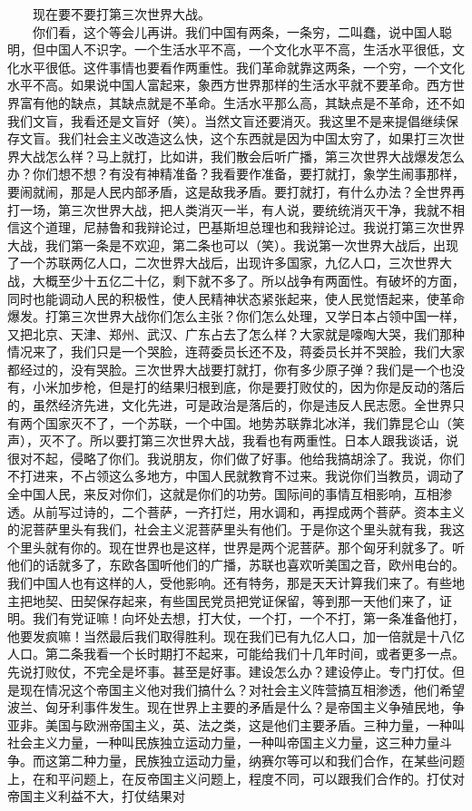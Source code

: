 \documentclass[cn,11pt,chinese]{elegantbook}
\begin{document}
　　现在要不要打第三次世界大战。\\
　　你们看，这个等会儿再讲。我们中国有两条，一条穷，二叫蠢，说中国人聪明，但中国人不识字。一个生活水平不高，一个文化水平不高，生活水平很低，文化水平很低。这件事情也要看作两重性。我们革命就靠这两条，一个穷，一个文化水平不高。如果说中国人富起来，象西方世界那样的生活水平就不要革命。西方世界富有他的缺点，其缺点就是不革命。生活水平那么高，其缺点是不革命，还不如我们文盲，我看还是文盲好（笑）。当然文盲还要消灭。我这里不是来提倡继续保存文盲。我们社会主义改造这么快，这个东西就是因为中国太穷了，如果打三次世界大战怎么样？马上就打，比如讲，我们散会后听广播，第三次世界大战爆发怎么办？你们想不想？有没有神精准备？我看要作准备，要打就打，象学生闹事那样，要闹就闹，那是人民内部矛盾，这是敌我矛盾。要打就打，有什么办法？全世界再打一场，第三次世界大战，把人类消灭一半，有人说，要统统消灭干净，我就不相信这个道理，尼赫鲁和我辩论过，巴基斯坦总理也和我辩论过。我说打第三次世界大战，我们第一条是不欢迎，第二条也可以（笑）。我说第一次世界大战后，出现了一个苏联两亿人口，二次世界大战后，出现许多国家，九亿人口，三次世界大战，大概至少十五亿二十亿，剩下就不多了。所以战争有两面性。有破坏的方面，同时也能调动人民的积极性，使人民精神状态紧张起来，使人民觉悟起来，使革命爆发。打第三次世界大战你们怎么主张？你们怎么处理，又学日本占领中国一样，又把北京、天津、郑州、武汉、广东占去了怎么样？大家就是嚎啕大哭，我们那种情况来了，我们只是一个哭脸，连蒋委员长还不及，蒋委员长并不哭脸，我们大家都经过的，没有哭脸。三次世界大战要打就打，你有多少原子弹？我们是一个也没有，小米加步枪，但是打的结果归根到底，你是要打败仗的，因为你是反动的落后的，虽然经济先进，文化先进，可是政治是落后的，你是违反人民志愿。全世界只有两个国家灭不了，一个苏联，一个中国。地势苏联靠北冰洋，我们靠昆仑山（笑声），灭不了。所以要打第三次世界大战，我看也有两重性。日本人跟我谈话，说很对不起，侵略了你们。我说朋友，你们做了好事。他给我搞胡涂了。我说，你们不打进来，不占领这么多地方，中国人民就教育不过来。我说你们当教员，调动了全中国人民，来反对你们，这就是你们的功劳。国际间的事情互相影响，互相渗透。从前写过诗的，二个菩萨，一齐打烂，用水调和，再捏成两个菩萨。资本主义的泥菩萨里头有我们，社会主义泥菩萨里头有他们。于是你这个里头就有我，我这个里头就有你的。现在世界也是这样，世界是两个泥菩萨。那个匈牙利就多了。听他们的话就多了，东欧各国听他们的广播，苏联也喜欢听美国之音，欧州电台的。我们中国人也有这样的人，受他影响。还有特务，那是天天计算我们来了。有些地主把地契、田契保存起来，有些国民党员把党证保留，等到那一天他们来了，证明。我们有党证嘛！向坏处去想，打大仗，一个打，一个不打，第一条准备他打，他要发疯嘛！当然最后我们取得胜利。现在我们已有九亿人口，加一倍就是十八亿人口。第二条我看一个长时期打不起来，可能给我们十几年时间，或者更多一点。先说打败仗，不完全是坏事。甚至是好事。建设怎么办？建设停止。专门打仗。但是现在情况这个帝国主义他对我们搞什么？对社会主义阵营搞互相渗透，他们希望波兰、匈牙利事件发生。现在世界上主要的矛盾是什么？是帝国主义争殖民地，争亚非。美国与欧洲帝国主义，英、法之类，这是他们主要矛盾。三种力量，一种叫社会主义力量，一种叫民族独立运动力量，一种叫帝国主义力量，这三种力量斗争。而这第二种力量，民族独立运动力量，纳赛尔等可以和我们合作，在某些问题上，在和平问题上，在反帝国主义问题上，程度不同，可以跟我们合作的。打仗对帝国主义利益不大，打仗结果对
\end{document}
